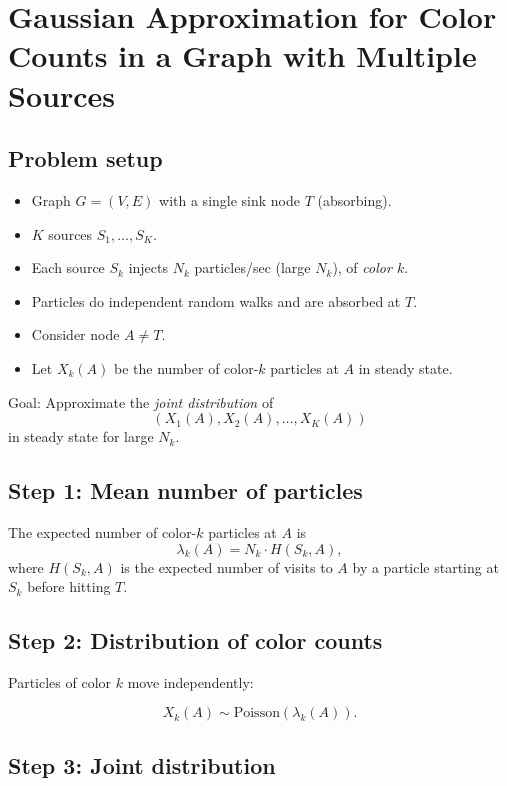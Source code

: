 \documentclass[11pt]{article}
\begin{document}
\section*{Gaussian Approximation for Color Counts in a Graph with Multiple Sources}

\subsection*{Problem setup}

\begin{itemize}
\item Graph $G = (V,E)$ with a single sink node $T$ (absorbing).
\item $K$ sources $S_1,\ldots,S_K$.
\item Each source $S_k$ injects $N_k$ particles/sec (large $N_k$), of \emph{color $k$}.
\item Particles do independent random walks and are absorbed at $T$.
\item Consider node $A \neq T$.
\item Let $X_k(A)$ be the number of color-$k$ particles at $A$ in steady state.
\end{itemize}

Goal: Approximate the \emph{joint distribution} of
\[
(X_1(A), X_2(A), \ldots, X_K(A))
\]
in steady state for large $N_k$.

\subsection*{Step 1: Mean number of particles}

The expected number of color-$k$ particles at $A$ is
\[
\lambda_k(A) = N_k \cdot H(S_k, A),
\]
where $H(S_k,A)$ is the expected number of visits to $A$ by a particle starting at $S_k$ before hitting $T$.

\subsection*{Step 2: Distribution of color counts}

Particles of color $k$ move independently:

\[
X_k(A) \sim \mathrm{Poisson}(\lambda_k(A)).
\]

\subsection*{Step 3: Joint distribution}
\end{document}
